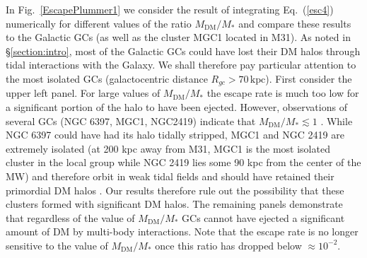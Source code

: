 \documentclass[aps,floatfix,prd,showpacs]{revtex4}
\newcommand{\MDM}{M_{\mathrm{DM}}}
\newcommand{\kpc}{\textrm{kpc}}
\begin{document}
In Fig.~\ref{EscapePlummer1} we consider the result of integrating Eq.~(\ref{esc4}) numerically for different values of the ratio $\MDM/M_*$ and compare these results to the Galactic GCs (as well as the cluster MGC1 located in M31).  As noted in \S\ref{section:intro}, most of the Galactic GCs could have lost their DM halos through tidal interactions with the Galaxy.  We shall therefore pay particular attention to the most isolated GCs (galactocentric distance $R_{gc} > 70\, \kpc$).  First consider the upper left panel.  For large values of $\MDM/M_*$ the escape rate is much too low for a significant portion of the halo to have been ejected.  However, observations of several GCs (NGC 6397, MGC1, NGC2419) indicate that $\MDM/M_* \lesssim 1$ \cite{Shin,Conroy}.  While NGC 6397 could have had its halo tidally stripped, MGC1 and NGC 2419 are extremely isolated (at 200 kpc away from M31, MGC1 is the most isolated cluster in the local group while NGC 2419 lies some 90 kpc from the center of the MW) and therefore orbit in weak tidal fields and should have retained their primordial DM halos \cite{Conroy}.  Our results therefore rule out the possibility that these clusters formed with significant DM halos.  The remaining panels demonstrate that regardless of the value of $\MDM/M_*$ GCs cannot have ejected a significant amount of DM by multi-body interactions.  Note that the escape rate is no longer sensitive to the value of $\MDM/M_*$ once this ratio has dropped below $\approx 10^{-2}$.
%
\end{document}
